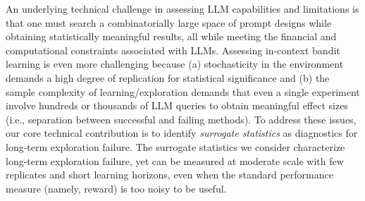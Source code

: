   An underlying technical challenge in assessing LLM
capabilities and limitations is that one must search a combinatorially large space of
prompt designs while obtaining statistically meaningful results, all
while meeting the financial and computational constraints associated with
LLMs. Assessing in-context bandit learning
is even more challenging because (a) stochasticity in the environment
demands a high degree of replication for statistical significance and
(b) the sample complexity of learning/exploration demands that even a
single experiment involve hundreds or thousands of LLM queries to obtain meaningful
effect sizes (i.e., separation between successful and failing methods).
To address these issues, our core technical contribution is to
identify \emph{surrogate statistics} as diagnostics for long-term exploration failure. The surrogate statistics we consider characterize long-term exploration failure, yet can be
measured at moderate scale with few replicates and short learning
horizons, even when
the standard performance measure (namely,
reward) 
is too noisy to be useful.



